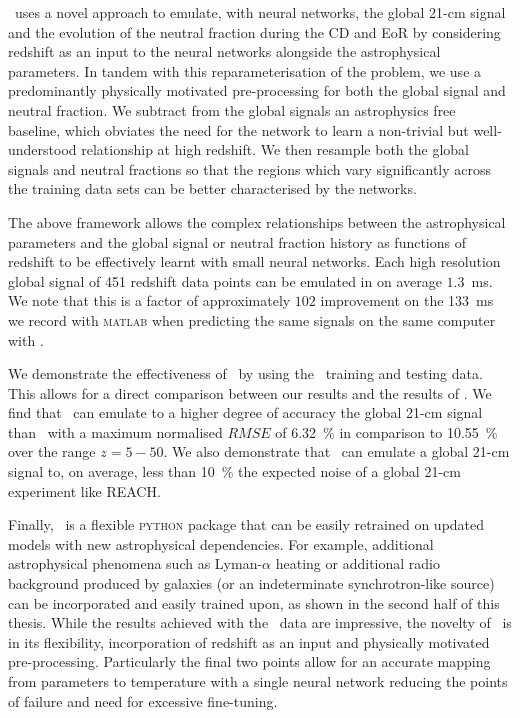 \name~uses a novel approach to emulate, with neural networks, the global 21-cm signal and the evolution of the neutral fraction during the CD and EoR by considering redshift as an input to the neural networks alongside the astrophysical parameters. In tandem with this reparameterisation of the problem, we use a predominantly physically motivated pre-processing for both the global signal and neutral fraction. We subtract from the global signals an astrophysics free baseline, which obviates the need for the network to learn a non-trivial but well-understood relationship at high redshift. We then resample both the global signals and neutral fractions so that the regions which vary significantly across the training data sets can be better characterised by the networks.

The above framework allows the complex relationships between the astrophysical parameters and the global signal or neutral fraction history as functions of redshift to be effectively learnt with small neural networks. Each high resolution global signal of 451 redshift data points can be emulated in on average $1.3$~ms. We note that this is a factor of approximately $102$ improvement on the 133~ms we record with \textsc{matlab} when predicting the same signals on the same computer with \cmGEM.

We demonstrate the effectiveness of \name~by using the \cmGEM~training and testing data. This allows for a direct comparison between our results and the results of \cmGEM. We find that \name~can emulate to a higher degree of accuracy the global 21-cm signal than \cmGEM~with a maximum normalised $RMSE$ of 6.32~\% in comparison to 10.55~\% over the range $z = 5 -50$. We also demonstrate that \name~can emulate a global 21-cm signal to, on average, less than 10~\% the expected noise of a global 21-cm experiment like REACH.

Finally, \name~is a flexible \textsc{python} package that can be easily retrained on updated models with new astrophysical dependencies. For example, additional astrophysical phenomena such as Lyman-$\alpha$ heating \citep{Reis_sta_2021} or additional radio background produced by galaxies (or an indeterminate synchrotron-like source) \citep{Fialkov2019, Reis2020} can be incorporated and easily trained upon, as shown in the second half of this thesis. While the results achieved with the \cmGEM~data are impressive, the novelty of \name~is in its flexibility, incorporation of redshift as an input and physically motivated pre-processing. Particularly the final two points allow for an accurate mapping from parameters to temperature with a single neural network reducing the points of failure and need for excessive fine-tuning.

